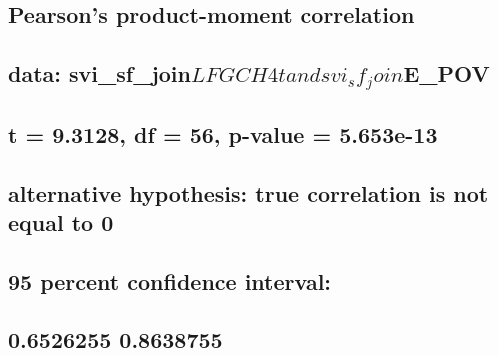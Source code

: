 \documentclass[
  12pt,
]{article}
\begin{document}
\begin{verbatim}
\end{verbatim}

\hypertarget{section-60}{%
\subsection{}\label{section-60}}

\hypertarget{pearsons-product-moment-correlation-6}{%
\subsection{Pearson's product-moment
correlation}\label{pearsons-product-moment-correlation-6}}

\hypertarget{section-61}{%
\subsection{}\label{section-61}}

\hypertarget{data-svi_sf_joinlfgch4t-and-svi_sf_joine_pov}{%
\subsection{\texorpdfstring{data:
svi\_sf\_join\(LFGCH4t and svi_sf_join\)E\_POV}{data: svi\_sf\_joinLFGCH4t and svi\_sf\_joinE\_POV}}\label{data-svi_sf_joinlfgch4t-and-svi_sf_joine_pov}}

\hypertarget{t-9.3128-df-56-p-value-5.653e-13}{%
\subsection{t = 9.3128, df = 56, p-value =
5.653e-13}\label{t-9.3128-df-56-p-value-5.653e-13}}

\hypertarget{alternative-hypothesis-true-correlation-is-not-equal-to-0-6}{%
\subsection{alternative hypothesis: true correlation is not equal to
0}\label{alternative-hypothesis-true-correlation-is-not-equal-to-0-6}}

\hypertarget{percent-confidence-interval-6}{%
\subsection{95 percent confidence
interval:}\label{percent-confidence-interval-6}}

\hypertarget{section-62}{%
\subsection{0.6526255 0.8638755}\label{section-62}}
\end{document}
